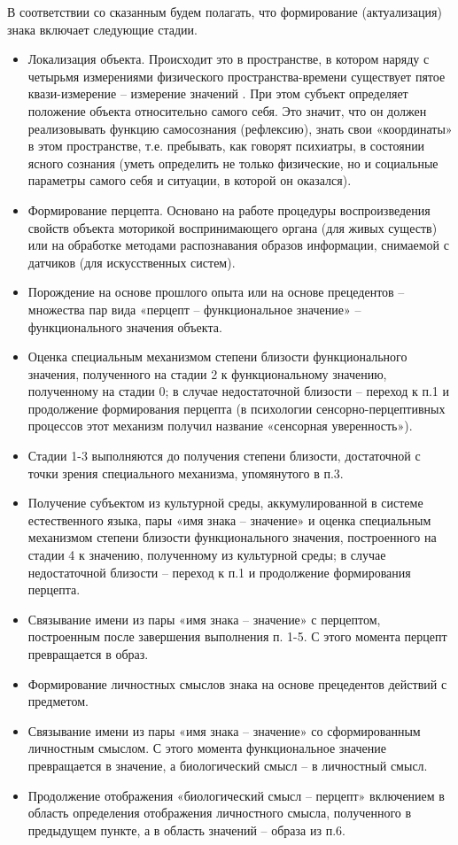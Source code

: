 В соответствии со сказанным будем полагать, что формирование (актуализация) знака включает следующие стадии.
\begin{itemize}
	\setcounter{enumi}{0}
	\item Локализация объекта. Происходит это в пространстве, в котором наряду с четырьмя измерениями физического пространства-времени существует пятое квази-измерение – измерение значений \cite{Leontiev1983}. При этом субъект определяет положение объекта относительно самого себя. Это значит, что он должен реализовывать функцию самосознания (рефлексию), знать свои «координаты» в этом пространстве, т.е. пребывать, как говорят психиатры, в состоянии ясного сознания (уметь определить не только физические, но и социальные параметры самого себя и ситуации, в которой он оказался).
	\item Формирование перцепта. Основано на работе процедуры воспроизведения свойств объекта моторикой воспринимающего органа (для живых существ) или на обработке методами распознавания образов информации, снимаемой с датчиков (для искусственных систем).
	\item Порождение на основе прошлого опыта или на основе прецедентов – множества пар вида «перцепт – функциональное значение» – функционального значения объекта.
	\item Оценка специальным механизмом степени близости функционального значения, полученного на стадии 2 к функциональному значению, полученному на стадии 0; в случае недостаточной близости – переход к п.1 и продолжение формирования перцепта (в психологии сенсорно-перцептивных процессов этот механизм получил название «сенсорная уверенность»).
	\item Стадии 1-3 выполняются до получения степени близости, достаточной с точки зрения специального механизма, упомянутого в п.3.
	\item Получение субъектом из культурной среды, аккумулированной в системе естественного языка, пары «имя знака – значение» и оценка специальным механизмом степени близости функционального значения, построенного на стадии 4 к значению, полученному из культурной среды; в случае недостаточной близости – переход к п.1 и продолжение формирования перцепта.
	\item Связывание имени из пары «имя знака – значение» с перцептом, построенным после завершения выполнения п. 1-5. С этого момента перцепт превращается в образ.
	\item Формирование личностных смыслов знака на основе прецедентов действий с предметом.
	\item Связывание имени из пары «имя знака – значение» со сформированным личностным смыслом. С этого момента функциональное значение превращается в значение, а биологический смысл – в личностный смысл.
	\item Продолжение отображения «биологический смысл – перцепт» включением в область определения отображения личностного смысла, полученного в предыдущем пункте, а в область значений – образа из п.6.
\end{itemize}

